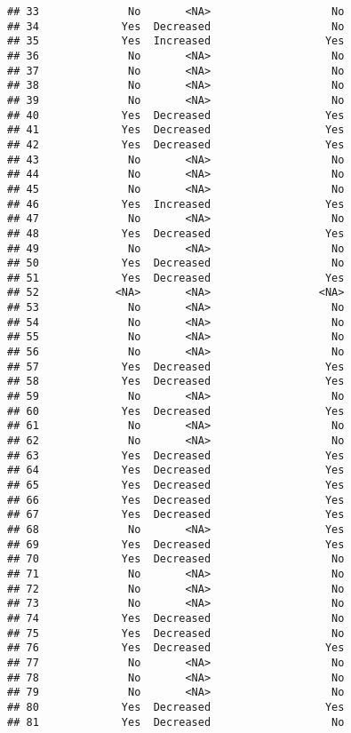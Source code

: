 \documentclass[
]{article}
\begin{document}
\begin{verbatim}
## 33              No       <NA>                   No
## 34             Yes  Decreased                   No
## 35             Yes  Increased                  Yes
## 36              No       <NA>                   No
## 37              No       <NA>                   No
## 38              No       <NA>                   No
## 39              No       <NA>                   No
## 40             Yes  Decreased                  Yes
## 41             Yes  Decreased                  Yes
## 42             Yes  Decreased                  Yes
## 43              No       <NA>                   No
## 44              No       <NA>                   No
## 45              No       <NA>                   No
## 46             Yes  Increased                  Yes
## 47              No       <NA>                   No
## 48             Yes  Decreased                  Yes
## 49              No       <NA>                   No
## 50             Yes  Decreased                   No
## 51             Yes  Decreased                  Yes
## 52            <NA>       <NA>                 <NA>
## 53              No       <NA>                   No
## 54              No       <NA>                   No
## 55              No       <NA>                   No
## 56              No       <NA>                   No
## 57             Yes  Decreased                  Yes
## 58             Yes  Decreased                  Yes
## 59              No       <NA>                   No
## 60             Yes  Decreased                  Yes
## 61              No       <NA>                   No
## 62              No       <NA>                   No
## 63             Yes  Decreased                  Yes
## 64             Yes  Decreased                  Yes
## 65             Yes  Decreased                  Yes
## 66             Yes  Decreased                  Yes
## 67             Yes  Decreased                  Yes
## 68              No       <NA>                  Yes
## 69             Yes  Decreased                  Yes
## 70             Yes  Decreased                   No
## 71              No       <NA>                   No
## 72              No       <NA>                   No
## 73              No       <NA>                   No
## 74             Yes  Decreased                   No
## 75             Yes  Decreased                   No
## 76             Yes  Decreased                  Yes
## 77              No       <NA>                   No
## 78              No       <NA>                   No
## 79              No       <NA>                   No
## 80             Yes  Decreased                  Yes
## 81             Yes  Decreased                   No

\end{verbatim}
\end{document}
